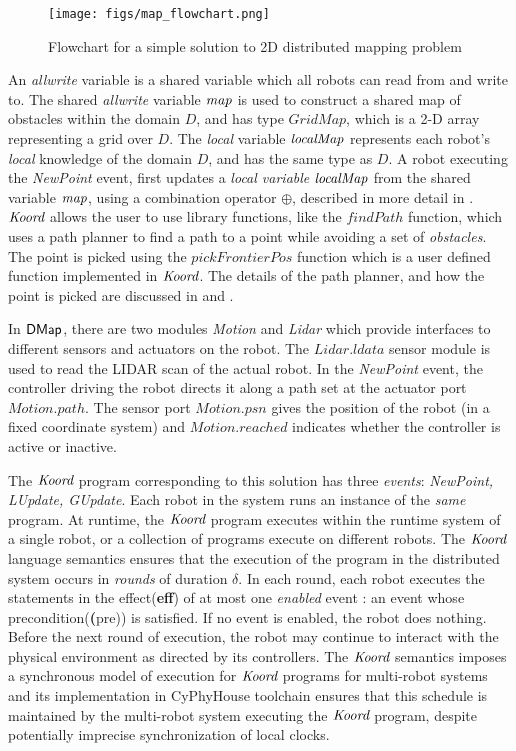 \begin{figure}[!htbp]
    \centering
    \texttt{[image: figs/map\_flowchart.png]}
    \caption{Flowchart for a simple solution to 2D distributed mapping problem\vspace{-2mm}}
    \label{fig:flowmap1}
\end{figure}

 An \emph{allwrite} variable is a shared variable which all robots can read from and write to. The shared \emph{allwrite} variable $\mathit{map}$ is used to construct a shared map of obstacles within the domain $D$, and has type $\mathit{GridMap}$, which is a 2-D array representing a grid over $D$. The \emph{local} variable $\mathit{localMap}$ represents each robot's \emph{local} knowledge of the domain $D$, and has the same type as $D$. A robot executing the \emph{NewPoint} event, first updates a \emph{local variable} $\mathit{localMap}$ from the shared variable $\mathit{map}$, using a combination operator $\oplus$, described in more detail in . $\emph{Koord}$ allows the user to use library functions, like the $\mathit{findPath}$ function, which uses a path planner to find a path to a point while avoiding a set of \emph{obstacles}. The point is picked using the $\mathit{pickFrontierPos}$ function which is a user defined function implemented in $\emph{Koord}$. The details of the path planner, and how the point is picked are discussed in and  .

In ${\sf DMap}$, there are two modules \emph{Motion} and \emph{Lidar} which provide interfaces to different sensors and actuators on the robot. The $\mathit{Lidar.ldata}$ sensor module is used to read the LIDAR scan of the actual robot. In the \emph{NewPoint} event, the controller driving the robot directs it along a path set at the actuator port $\mathit{Motion.path}$. The sensor port $\mathit{Motion.psn}$ gives the position of the robot (in a fixed coordinate system) and $\mathit{Motion.reached}$ indicates whether the controller is active or inactive.

The $\emph{Koord}$ program corresponding to this solution has three \emph{events}: \emph{NewPoint, LUpdate, GUpdate}. Each robot in the system runs an instance of the \emph{same} program. At runtime, the $\emph{Koord}$ program executes within the runtime system of a single robot, or a collection of programs execute on different robots. The $\emph{Koord}$ language semantics ensures that the execution of the program in the distributed system occurs in \emph{rounds} of duration $\delta$. In each round, each robot executes the statements in the effect(\textbf{eff}) of at most one \emph{enabled} event : an event whose precondition(\textbf(pre)) is satisfied. If no event is enabled, the robot does nothing. Before the next round of execution, the robot may continue to interact with the physical environment as directed by its controllers. The $\emph{Koord}$ semantics imposes a synchronous model of execution for $\emph{Koord}$ programs for multi-robot systems and its implementation in CyPhyHouse toolchain ensures that this schedule is maintained by the multi-robot system executing the $\emph{Koord}$ program, despite potentially imprecise synchronization of local clocks.

